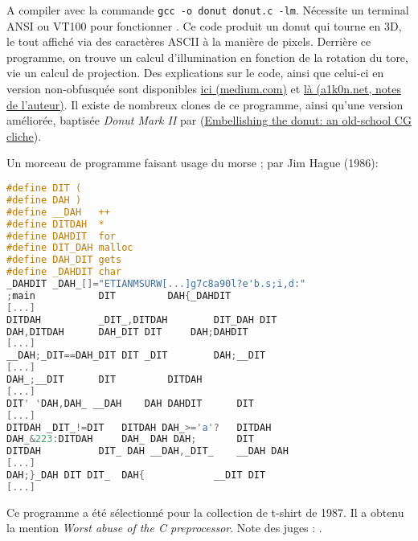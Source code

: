 \documentclass[12pt]{article} %
\begin{document}
A compiler avec la commande \verb|gcc -o donut donut.c -lm|. Nécessite un terminal ANSI ou VT100 pour fonctionner \cite{ASloane-donut}. Ce code produit un donut qui tourne en 3D, le tout affiché via des caractères ASCII à la manière de pixels. Derrière ce programme, on trouve un calcul d'illumination en fonction de la rotation du tore, vie un calcul de projection. Des explications sur le code, ainsi que celui-ci en version non-obfusquée sont disponibles \href{https://medium.com/analytics-vidhya/the-donuts-code-the-math-behind-6d473eaec61d}{ici (medium.com)} et \href{https://www.a1k0n.net/2011/07/20/donut-math.html}{là (a1k0n.net, notes de l'auteur)}. Il existe de nombreux clones de ce programme, ainsi qu'une version améliorée, baptisée \textit{Donut Mark II} par \citeauthor{ASloane-donut} (\href{https://www.a1k0n.net/2006/09/20/obfuscated-c-donut-2.html}{Embellishing the donut: an old-school CG cliche}).

\newpage
Un morceau de programme faisant usage du morse ; par Jim Hague (1986):
\begin{lstlisting}[language=C, caption={Morse}, label={code:morse}]
#define	DIT	(
#define	DAH	)
#define	__DAH	++
#define DITDAH	*
#define	DAHDIT	for
#define	DIT_DAH	malloc
#define DAH_DIT	gets
#define	_DAHDIT	char
_DAHDIT _DAH_[]="ETIANMSURW[...]g7c8a90l?e'b.s;i,d:"
;main			DIT			DAH{_DAHDIT
[...]
DITDAH			_DIT_,DITDAH		DIT_DAH DIT
DAH,DITDAH		DAH_DIT DIT		DAH;DAHDIT
[...]
__DAH;_DIT==DAH_DIT	DIT _DIT		DAH;__DIT
[...]
DAH_;__DIT		DIT			DITDAH
[...]
DIT' 'DAH,DAH_ __DAH	DAH DAHDIT		DIT
[...]
DITDAH _DIT_!=DIT	DITDAH DAH_>='a'?	DITDAH
DAH_&223:DITDAH		DAH_ DAH DAH;		DIT
DITDAH			DIT_ DAH __DAH,_DIT_	__DAH DAH
[...]
DAH;}_DAH DIT DIT_	DAH{			__DIT DIT
[...]
\end{lstlisting}
Ce programme a été sélectionné pour la collection de t-shirt de 1987. Il a obtenu la mention \textit{Worst abuse of the C preprocessor}. Note des juges :  \cite{JHague-morse}.
\end{document}
